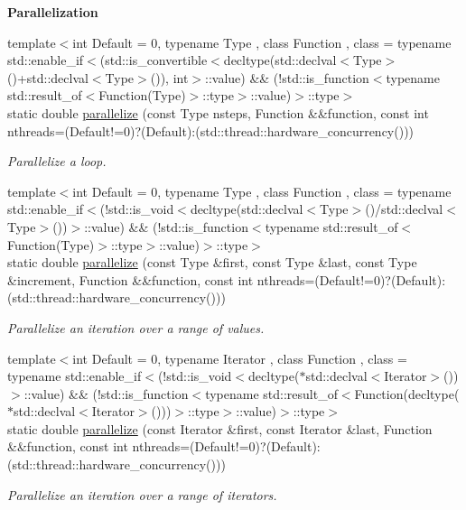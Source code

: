 \begin{Indent}{\bf Parallelization}\par
\begin{DoxyCompactItemize}
\item 
{\footnotesize template$<$int Default = 0, typename Type , class Function , class  = typename std\-::enable\-\_\-if$<$(std\-::is\-\_\-convertible$<$decltype(std\-::declval$<$\-Type$>$()+std\-::declval$<$\-Type$>$()), int$>$\-::value) \&\& (!std\-::is\-\_\-function$<$typename std\-::result\-\_\-of$<$\-Function(\-Type)$>$\-::type$>$\-::value)$>$\-::type$>$ }\\static double \hyperlink{exceptionUtility_a9b35ecb9385f2ebe5790603b68cd5fd2}{parallelize} (const Type nsteps, Function \&\&function, const int nthreads=(Default!=0)?(Default)\-:(std\-::thread\-::hardware\-\_\-concurrency()))
\begin{DoxyCompactList}\small\item\em Parallelize a loop. \end{DoxyCompactList}\item 
{\footnotesize template$<$int Default = 0, typename Type , class Function , class  = typename std\-::enable\-\_\-if$<$(!std\-::is\-\_\-void$<$decltype(std\-::declval$<$\-Type$>$()/std\-::declval$<$\-Type$>$())$>$\-::value) \&\& (!std\-::is\-\_\-function$<$typename std\-::result\-\_\-of$<$\-Function(\-Type)$>$\-::type$>$\-::value)$>$\-::type$>$ }\\static double \hyperlink{exceptionUtility_a9125993caa1c19cc24a92401773bf979}{parallelize} (const Type \&first, const Type \&last, const Type \&increment, Function \&\&function, const int nthreads=(Default!=0)?(Default)\-:(std\-::thread\-::hardware\-\_\-concurrency()))
\begin{DoxyCompactList}\small\item\em Parallelize an iteration over a range of values. \end{DoxyCompactList}\item 
{\footnotesize template$<$int Default = 0, typename Iterator , class Function , class  = typename std\-::enable\-\_\-if$<$(!std\-::is\-\_\-void$<$decltype($\ast$std\-::declval$<$\-Iterator$>$())$>$\-::value) \&\& (!std\-::is\-\_\-function$<$typename std\-::result\-\_\-of$<$\-Function(decltype($\ast$std\-::declval$<$\-Iterator$>$()))$>$\-::type$>$\-::value)$>$\-::type$>$ }\\static double \hyperlink{exceptionUtility_a62d54b2aa4e6688976aff399e72c0021}{parallelize} (const Iterator \&first, const Iterator \&last, Function \&\&function, const int nthreads=(Default!=0)?(Default)\-:(std\-::thread\-::hardware\-\_\-concurrency()))
\begin{DoxyCompactList}\small\item\em Parallelize an iteration over a range of iterators. \end{DoxyCompactList}\end{DoxyCompactItemize}
\end{Indent}
